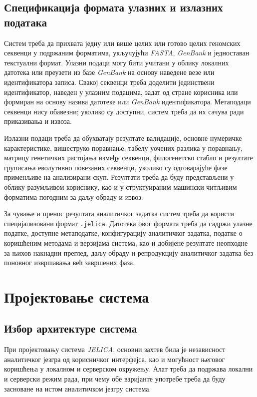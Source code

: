 \documentclass[12pt,oneside]{memoir}
\begin{document}
\subsection{Спецификација формата улазних и излазних података}
\label{sec:specification-of-input-and-output-data-formats}
Систем треба да прихвата једну или више целих или готово целих геномских секвенци у подржаним форматима, укључујући \textit{FASTA}, \textit{GenBank} и једноставан текстуални формат. Улазни подаци могу бити учитани у облику локалних датотека или преузети из базе \textit{GenBank} на основу наведене везе или идентификатора записа. Свакој секвенци треба доделити јединствени идентификатор, наведен у улазним подацима, задат од стране корисника или формиран на основу назива датотеке или \textit{GenBank} идентификатора. Метаподаци секвенци нису обавезни; уколико су доступни, систем треба да их сачува ради приказивања и извоза.

Излазни подаци треба да обухватају резултате валидације, основне нумеричке карактеристике, вишеструко поравнање, табелу уочених разлика у поравнању, матрицу генетичких растојања између секвенци, филогенетско стабло и резултате груписања еволутивно повезаних секвенци, уколико су одговарајуће фазе применљиве на анализирани скуп. Резултати треба да буду представљени у облику разумљивом кориснику, као и у структуираним машински читљивим форматима погодним за даљу обраду и извоз.

За чување и пренос резултата аналитичког задатка систем треба да користи специјализовани формат \texttt{.jelica}. Датотека овог формата треба да садржи улазне податке, доступне метаподатке, конфигурацију аналитичког задатка, податке о коришћеним методама и верзијама система, као и добијене резултате неопходне за њихов накнадни преглед, даљу обраду и репродукцију аналитичког задатка без поновног извршавања већ завршених фаза.

\section{Пројектовање система}
\label{sec:system-design}

\subsection{Избор архитектуре система}
\label{sec:choosing-a-system-architecture}
При пројектовању система \textit{JELICA}, основни захтев била је независност аналитичког језгра од корисничког интерфејса, као и могућност његовог коришћења у локалном и серверском окружењу. Алат треба да подржава локални и серверски режим рада, при чему обе варијанте употребе треба да буду засноване на истом аналитичком језгру система.
\end{document}
